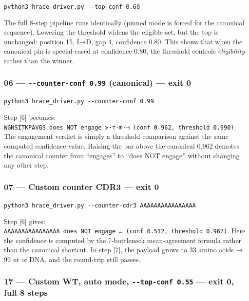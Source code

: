 \documentclass[12pt,a4paper]{article}
\begin{document}
\texttt{python3\ hrace\_driver.py\ -\/-top-conf\ 0.60}

The full 8-step pipeline runs identically (pinned mode is forced for the
canonical sequence). Lowering the threshold widens the eligible set, but
the top is unchanged: position 15, I→D, gap 4, confidence 0.80. This
shows that when the canonical pin is special-cased at confidence 0.80,
the threshold controls \emph{eligibility} rather than the winner.

\hypertarget{counter-conf-0.99-canonical-exit-0}{%
\subsubsection{\texorpdfstring{06 --- \texttt{-\/-counter-conf\ 0.99}
(canonical) --- exit
0}{06 --- -\/-counter-conf 0.99 (canonical) --- exit 0}}\label{counter-conf-0.99-canonical-exit-0}}

\texttt{python3\ hrace\_driver.py\ -\/-counter-conf\ 0.99}

Step {[}6{]} becomes:
\texttt{WGNSITKPAVGS\ does\ NOT\ engage\ ≻·⊤·⊞·⊣\ (conf\ 0.962,\ threshold\ 0.990)}.
The engagement verdict is simply a threshold comparison against the same
computed confidence value. Raising the bar above the canonical 0.962
demotes the canonical counter from ``engages'' to ``does NOT engage''
without changing any other step.

\hypertarget{custom-counter-cdr3-exit-0}{%
\subsubsection{07 --- Custom counter CDR3 --- exit
0}\label{custom-counter-cdr3-exit-0}}

\texttt{python3\ hrace\_driver.py\ -\/-counter-cdr3\ AAAAAAAAAAAAAAAA}

Step {[}6{]} gives:
\texttt{AAAAAAAAAAAAAAAA\ does\ NOT\ engage\ \ldots{}\ (conf\ 0.512,\ threshold\ 0.962)}.
Here the confidence is computed by the 7-bottleneck mean-agreement
formula rather than the canonical shortcut. In step {[}7{]}, the payload
grows to 33 amino acids → 99 nt of DNA, and the round-trip still passes.

\hypertarget{custom-wt-auto-mode---top-conf-0.55-exit-0-full-8-steps}{%
\subsubsection{\texorpdfstring{17 --- Custom WT, auto mode,
\texttt{-\/-top-conf\ 0.55} --- exit 0, full 8
steps}{17 --- Custom WT, auto mode, -\/-top-conf 0.55 --- exit 0, full 8 steps}}\label{custom-wt-auto-mode---top-conf-0.55-exit-0-full-8-steps}}
\end{document}
